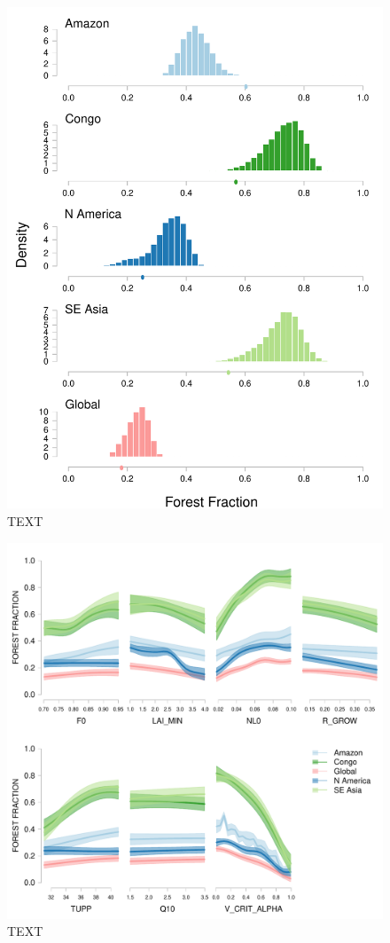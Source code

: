 \documentclass[esd, manuscript]{copernicus}
\begin{document}
\begin{figure}[t]
\includegraphics[width=12cm]{graphics/credible_NROY_hists.pdf}
\caption{TEXT}
\label{fig:credible_NROY_hists}
\end{figure}

\begin{figure}[t]
\includegraphics[width=12cm]{graphics/amaz_oat_sens.pdf}
\caption{TEXT}
\label{fig:amaz_oat_sens}
\end{figure}
\end{document}
